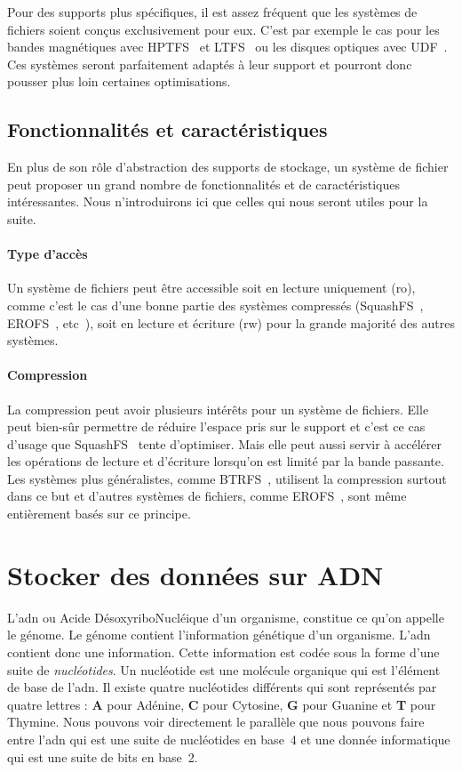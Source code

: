 \documentclass[a4paper]{report}
\makeatletter
\newcommand{\btrfs}{BTRFS~\cite{rodeh2013btrfs}\@\xspace}
\newcommand{\erofs}{EROFS~\cite{gao2019erofs}\@\xspace}
\newcommand{\hptfs}{HPTFS~\cite{zhang2006hptfs}\@\xspace}
\newcommand{\ltfs}{LTFS~\cite{pease2010linear}\@\xspace}
\newcommand{\squashfs}{SquashFS~\cite{lougher2009squashfs}\@\xspace}
\newcommand{\udf}{UDF~\cite{optical2003universal}\@\xspace}
\makeatother
\begin{document}
Pour des supports plus spécifiques, il est assez fréquent que les systèmes de fichiers soient conçus exclusivement pour eux.
C'est par exemple le cas pour les bandes magnétiques avec \hptfs et \ltfs ou les disques optiques avec \udf.
Ces systèmes seront parfaitement adaptés à leur support et pourront donc pousser plus loin certaines optimisations.

\subsection{Fonctionnalités et caractéristiques}

En plus de son rôle d'abstraction des supports de stockage,
un système de fichier peut proposer un grand nombre de fonctionnalités et de caractéristiques intéressantes.
Nous n'introduirons ici que celles qui nous seront utiles pour la suite.

\paragraph{Type d'accès}
Un système de fichiers peut être accessible soit en lecture uniquement (\ac{ro}),
comme c'est le cas d'une bonne partie des systèmes compressés (\squashfs, \erofs, etc~\textellipsis),
soit en lecture et écriture (\ac{rw}) pour la grande majorité des autres systèmes.

\paragraph{Compression}
La compression peut avoir plusieurs intérêts pour un système de fichiers.
Elle peut bien-sûr permettre de réduire l'espace pris sur le support
et c'est ce cas d'usage que \squashfs tente d'optimiser.
Mais elle peut aussi servir à accélérer les opérations de lecture et d'écriture lorsqu'on est limité par la bande passante.
Les systèmes plus généralistes, comme \btrfs, utilisent la compression surtout dans ce but
et d'autres systèmes de fichiers, comme \erofs, sont même entièrement basés sur ce principe.


\section{Stocker des données sur ADN}

L’\ac{adn} ou Acide DésoxyriboNucléique d’un organisme, constitue ce qu’on appelle le génome.
Le génome contient l’information génétique d’un organisme. L’\ac{adn} contient donc une information.
Cette information est codée sous la forme d’une suite de \emph{nucléotides}.
Un nucléotide est une molécule organique qui est l’élément de base de l’\ac{adn}.
Il existe quatre nucléotides différents qui sont représentés par quatre lettres : \textbf{A} pour Adénine, \textbf{C} pour Cytosine, \textbf{G} pour Guanine et \textbf{T} pour Thymine.
Nous pouvons voir directement le parallèle que nous pouvons faire entre l’\ac{adn} qui est une suite de nucléotides en base~4 et une donnée informatique qui est une suite de bits en base~2.
\end{document}
